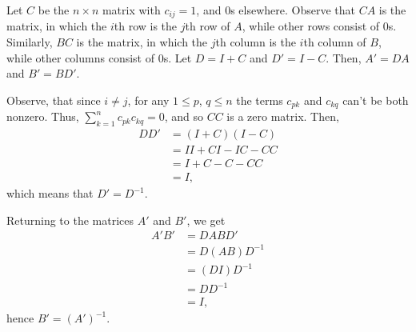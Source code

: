 Let $C$ be the $n\times n$ matrix with $c_{ij}=1$, and 0s elsewhere.
Observe that $CA$ is the matrix, in which the $i$th row is the $j$th row of $A$, while other rows consist of 0s.
Similarly, $BC$ is the matrix, in which the $j$th column is the $i$th column of $B$, while other columns consist of 0s.
Let $D=I+C$ and $D'=I-C$.
Then, $A'=DA$ and $B'=BD'$.

Observe, that since $i\ne j$, for any $1\le p$, $q\le n$ the terms $c_{pk}$ and $c_{kq}$ can't be both nonzero.
Thus, $\sum_{k=1}^nc_{pk}c_{kq}=0$, and so $CC$ is a zero matrix.
Then,
\begin{align*}
    DD' &= (I+C)(I-C) \\
    &= II+CI-IC-CC \\
    &= I+C-C-CC \\
    &= I,
\end{align*}
which means that $D'=D^{-1}$.

Returning to the matrices $A'$ and $B'$, we get
\begin{align*}
    A'B' &= DABD' \\
    &= D(AB)D^{-1} \\
    &= (DI)D^{-1} \\
    &= DD^{-1} \\
    &= I,
\end{align*}
hence $B'=(A')^{-1}$.
